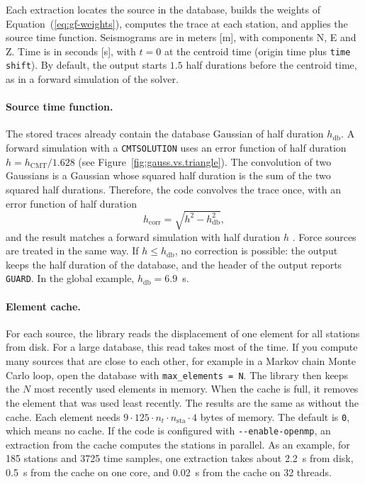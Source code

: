 Each extraction locates the source in the database, builds the weights of
Equation~(\ref{eq:gf-weights}), computes the trace at each station, and
applies the source time function. Seismograms are in meters [m], with
components N, E and Z. Time is in seconds [s], with $t=0$ at the centroid time
(origin time plus \texttt{time shift}). By default, the output starts $1.5$
half durations before the centroid time, as in a forward simulation of the solver.

\paragraph{Source time function.}
The stored traces already contain the database Gaussian of half duration
$h_{\mathrm{db}}$. A forward simulation with a \texttt{CMTSOLUTION} uses an error
function of half duration $h = h_{\mathrm{CMT}}/1.628$
(see Figure~\ref{fig:gauss.vs.triangle}). The convolution of two Gaussians is
a Gaussian whose squared half duration is the sum of the two squared half
durations. Therefore, the code convolves the trace once, with an error function
of half duration
\begin{equation}
h_{\mathrm{corr}} = \sqrt{h^2 - h_{\mathrm{db}}^2},
\end{equation}
and the result matches a forward simulation with half duration $h$
\citep{Sawade2024}. Force sources are treated in the same way. If
$h \le h_{\mathrm{db}}$, no correction is possible: the output keeps the
half duration of the database, and the header of the output reports
\texttt{GUARD}. In the global example, $h_{\mathrm{db}} = 6.9$~s.

\paragraph{Element cache.}
For each source, the library reads the displacement of one element for all
stations from disk. For a large database, this read takes most of the time.
If you compute many sources that are close to each other, for example in a
Markov chain Monte Carlo loop, open the database with
\texttt{max\_elements = N}. The library then keeps the $N$ most recently used
elements in memory. When the cache is full, it removes the element that was
used least recently. The results are the same as without the cache. Each
element needs $9\cdot125\cdot n_t\cdot n_{\mathrm{sta}}\cdot4$ bytes of memory.
The default is \texttt{0}, which means no cache. If the code is configured with
\texttt{-{}-enable-openmp}, an extraction from the cache computes the stations in
parallel. As an example, for 185 stations and 3725 time samples, one extraction takes
about 2.2~s from disk, 0.5~s from the cache on one core, and 0.02~s from the
cache on 32 threads.

